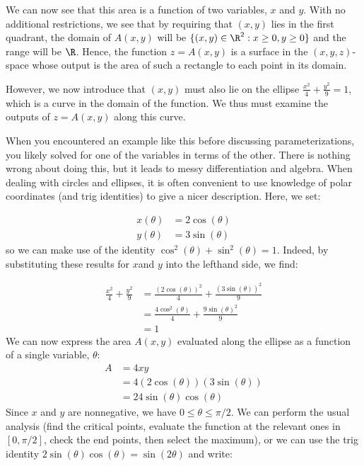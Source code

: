 \documentclass{ximera}
\begin{document}
\begin{example}
We can now see that this area is a function of two variables, $x$ and $y$.  With no additional restrictions, we see that by requiring that $(x,y)$ lies in the first quadrant, the domain of $A(x,y)$ will be $\{ (x,y) \in \R^2 : x \geq 0, y \geq 0 \}$ and the range will be $\R$.  Hence, the function $z = A(x,y)$ is a surface in the $(x,y,z)$-space whose output is the area of such a rectangle to each point in its domain. 

However, we now introduce that $(x,y)$ must also lie on the ellipse $\frac{x^2}{4}+\frac{y^2}{9} =1$, which is a curve in the domain of the function.  We thus must examine the outputs of $z=A(x,y)$ along this curve.  

When you encountered an example like this before discussing parameterizations, you likely solved for one of the variables in terms of the other.  There is nothing wrong about doing this, but it leads to messy differentiation and algebra.  When dealing with circles and ellipses, it is often convenient to use knowledge of polar coordinates (and trig identities) to give a nicer description.  Here, we set:

\begin{align*}
x(\theta) &= 2 \cos(\theta) \\
y(\theta) &= 3 \sin(\theta)
\end{align*}
so we can make use of the identity $\cos^2(\theta) + \sin^2(\theta) =1$.  Indeed, by substituting these results for $x$and $y$ into the lefthand side, we find:

\begin{align*}
  \frac{x^2}{4}+\frac{y^2}{9} &=\frac{(2 \cos(\theta))^2}{4}+\frac{(3 \sin(\theta))^2}{9}\\
  &=\frac{4 \cos^2(\theta)}{4}+\frac{9 \sin(\theta)^2}{9}\\
  &=1
\end{align*}
We can now express the area $A(x,y)$ evaluated along the ellipse as a
function of a single variable, $\theta$:
\begin{align*}
  A &= 4xy \\
  &= 4(2 \cos(\theta) )(3 \sin(\theta) ) \\
  &= 24 \sin(\theta)\cos(\theta)
\end{align*}
Since $x$ and $y$ are nonnegative, we have $0\le \theta \le \pi/2$.  We can perform the usual analysis (find the critical points, evaluate the function at the relevant ones in $[0,\pi/2]$, check the end points, then select the maximum), or we can use the trig identity $2\sin(\theta)\cos(\theta) = \sin(2\theta)$ and write:


\end{example}
\end{document}
